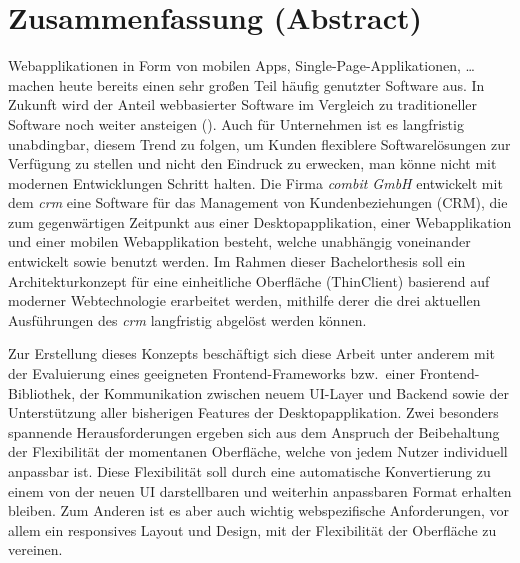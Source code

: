 \chapter{Zusammenfassung (Abstract)}

Webapplikationen in Form von mobilen Apps, Single-Page-Applikationen, \ldots {} machen heute bereits einen sehr großen Teil häufig genutzter Software aus.
In Zukunft wird der Anteil webbasierter Software im Vergleich zu traditioneller Software noch weiter ansteigen ().
Auch für Unternehmen ist es langfristig unabdingbar, diesem Trend zu folgen, um Kunden flexiblere Softwarelösungen zur Verfügung zu stellen und nicht den Eindruck zu erwecken, man könne nicht mit modernen Entwicklungen Schritt halten.
Die Firma \textit{combit GmbH} entwickelt mit dem \textit{\gls{crm}} eine Software für das Management von Kundenbeziehungen (\gls{CRM}), die zum gegenwärtigen Zeitpunkt aus einer Desktopapplikation, einer Webapplikation und einer mobilen Webapplikation besteht, welche unabhängig voneinander entwickelt sowie benutzt werden.
Im Rahmen dieser Bachelorthesis soll ein Architekturkonzept für eine einheitliche Oberfläche (ThinClient) basierend auf moderner Webtechnologie erarbeitet werden, mithilfe derer die drei aktuellen Ausführungen des \textit{\gls{crm}} langfristig abgelöst werden können.

Zur Erstellung dieses Konzepts beschäftigt sich diese Arbeit unter anderem mit der Evaluierung eines geeigneten Frontend-Frameworks bzw.\ einer Frontend-Bibliothek, der Kommunikation zwischen neuem UI-Layer und Backend sowie der Unterstützung aller bisherigen Features der Desktopapplikation.
Zwei besonders spannende Herausforderungen ergeben sich aus dem Anspruch der Beibehaltung der Flexibilität der momentanen Oberfläche, welche von jedem Nutzer individuell anpassbar ist. Diese Flexibilität soll durch eine automatische Konvertierung zu einem von der neuen UI darstellbaren und weiterhin anpassbaren Format erhalten bleiben. Zum Anderen ist es aber auch wichtig webspezifische Anforderungen, vor allem ein responsives Layout und Design, mit der Flexibilität der Oberfläche zu vereinen.
